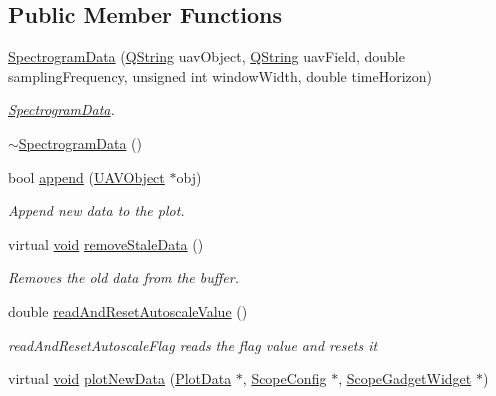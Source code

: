 \subsection*{\-Public \-Member \-Functions}
\begin{DoxyCompactItemize}
\item 
\hyperlink{group___scope_plugin_gaaac18b4298b3bb722d59928336254cd1}{\-Spectrogram\-Data} (\hyperlink{group___u_a_v_objects_plugin_gab9d252f49c333c94a72f97ce3105a32d}{\-Q\-String} uav\-Object, \hyperlink{group___u_a_v_objects_plugin_gab9d252f49c333c94a72f97ce3105a32d}{\-Q\-String} uav\-Field, double sampling\-Frequency, unsigned int window\-Width, double time\-Horizon)
\begin{DoxyCompactList}\small\item\em \hyperlink{class_spectrogram_data}{\-Spectrogram\-Data}. \end{DoxyCompactList}\item 
\hyperlink{group___scope_plugin_gafe709b6e448db73f8548bc2b76f27d19}{$\sim$\-Spectrogram\-Data} ()
\item 
bool \hyperlink{group___scope_plugin_gab2c059e5c5dea398eed663062df84fb6}{append} (\hyperlink{class_u_a_v_object}{\-U\-A\-V\-Object} $\ast$obj)
\begin{DoxyCompactList}\small\item\em \-Append new data to the plot. \end{DoxyCompactList}\item 
virtual \hyperlink{group___u_a_v_objects_plugin_ga444cf2ff3f0ecbe028adce838d373f5c}{void} \hyperlink{group___scope_plugin_ga6e71a34a3e6d00b99845ac4cdfabdde9}{remove\-Stale\-Data} ()
\begin{DoxyCompactList}\small\item\em \-Removes the old data from the buffer. \end{DoxyCompactList}\item 
double \hyperlink{group___scope_plugin_ga5adb8d57b4829f746f7437380b663d72}{read\-And\-Reset\-Autoscale\-Value} ()
\begin{DoxyCompactList}\small\item\em read\-And\-Reset\-Autoscale\-Flag reads the flag value and resets it \end{DoxyCompactList}\item 
virtual \hyperlink{group___u_a_v_objects_plugin_ga444cf2ff3f0ecbe028adce838d373f5c}{void} \hyperlink{group___scope_plugin_gadfdece3155868e0a61b6a481a663be74}{plot\-New\-Data} (\hyperlink{class_plot_data}{\-Plot\-Data} $\ast$, \hyperlink{class_scope_config}{\-Scope\-Config} $\ast$, \hyperlink{class_scope_gadget_widget}{\-Scope\-Gadget\-Widget} $\ast$)

\end{DoxyCompactItemize}
